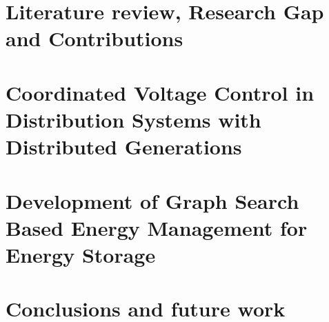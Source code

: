 \documentclass[11pt,expanded,copyright]{fsuthesis}
\begin{document}
\chapter{Literature review, Research Gap and Contributions}
\label{TH_LR}


\chapter{Coordinated Voltage Control in Distribution
Systems with Distributed Generations} \label{CVC}


\chapter{Development of Graph Search Based Energy Management for Energy Storage} \label{A8_cahp}



\chapter{Conclusions and future work}



\end{document}
